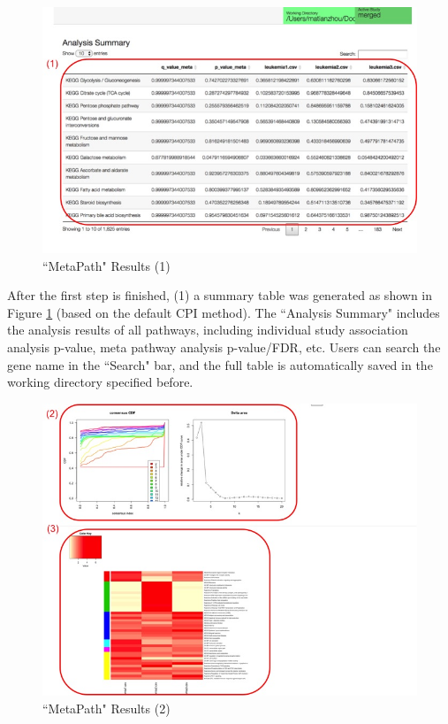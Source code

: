 \begin{figure}[H]
\begin{center}
\includegraphics[scale=0.45]{./figure/metaPath/metaPathresult1.jpg}
\caption{``MetaPath" Results (1)}
\label{fig:MetaPathresult1}
\end{center}
\end{figure}

After the first step is finished, (1) a summary table was generated as shown in Figure \ref{fig:MetaPathresult1} (based on the default CPI method). The ``Analysis Summary" includes the analysis results of all pathways, including individual study association analysis p-value, meta pathway analysis p-value/FDR, etc. Users can search the gene name in the ``Search" bar, and the full table is automatically saved in the working directory specified before.  

\begin{figure}[H]
\begin{center}
\includegraphics[scale=0.45]{./figure/metaPath/metaPathresult2.jpg}
\caption{``MetaPath" Results (2)}
\label{fig:MetaPathresult2}
\end{center}
\end{figure}

